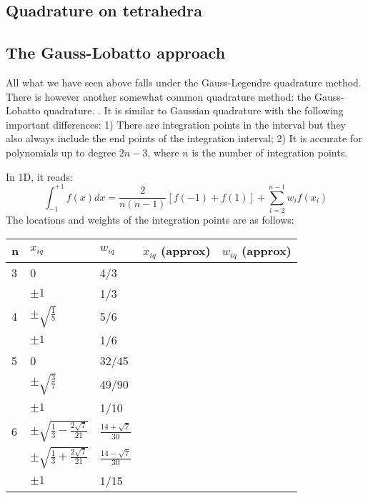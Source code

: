 \subsection{Quadrature on tetrahedra}




\subsection{The Gauss-Lobatto approach \label{sec:loba}}

All what we have seen above falls under the Gauss-Legendre quadrature method. There is however another 
somewhat common quadrature method: the Gauss-Lobatto  quadrature. .
It is similar to Gaussian quadrature with the following  important differences:
1) There are integration points in the interval but they also always include the end points of the integration interval;
2) It is accurate for polynomials up to degree $2n-3$, where $n$ is the number of integration points.

In 1D, it reads:
\[
\int_{-1}^{+1} f(x) dx = \frac{2}{n(n-1)} [f(-1)+f(1)] + \sum_{i=2}^{n-1} w_i f(x_i) 
\]
The locations and weights of the integration points are as follows:

\begin{center}
\begin{tabular}{lllll}
\hline
n & $x_{iq}$ & $w_{iq}$ & $x_{iq}$ (approx) & $w_{iq}$ (approx) \\
\hline\hline
3 & 0 & 4/3 & & \\
  & $\pm 1$ & 1/3 & &  \\
\hline
4 & $\pm\sqrt{\frac{1}{5}}$ & 5/6 & & \\
  & $\pm 1$ & 1/6 & & \\
\hline
5 & 0 & 32/45 & & \\
  & $\pm\sqrt{\frac{3}{7}}$ & 49/90 & & \\
  & $\pm 1$ & 1/10 & & \\
\hline
6 & $\pm\sqrt{\frac{1}{3} -\frac{2\sqrt{7}}{21}}$ & $\frac{14+\sqrt{7}}{30}$ & & \\
  & $\pm\sqrt{\frac{1}{3} +\frac{2\sqrt{7}}{21}}$ & $\frac{14-\sqrt{7}}{30}$ & & \\
  & $\pm 1$ & 1/15 \\
\hline
\end{tabular}
\end{center}

